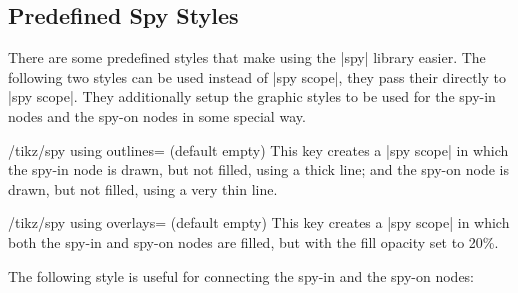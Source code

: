 \subsection{Predefined Spy Styles}

There are some predefined styles that make using the |spy| library
easier. The following two styles can be used instead of |spy scope|,
they pass their  directly to |spy scope|. They
additionally setup the graphic styles to be used for the spy-in nodes
and the spy-on nodes in some special way. 

\begin{key}{/tikz/spy using outlines= (default
    \normalfont empty)}
  This key creates a |spy scope| in which the spy-in node is drawn,
  but not filled, using a thick line; and the spy-on node is drawn,
  but not filled, using a very thin line.

\begin{codeexample}[]
\end{codeexample}
\end{key}

\begin{key}{/tikz/spy using overlays= (default
    \normalfont empty)}
  This key creates a |spy scope| in which both the spy-in and spy-on
  nodes are filled, but with the fill opacity set to 20\%.

\begin{codeexample}[]
\end{codeexample}
\end{key}

The following style is useful for connecting the spy-in and the spy-on
nodes:

